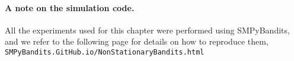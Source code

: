 


\paragraph{A note on the simulation code.}
%
All the experiments used for this chapter were performed using SMPyBandits,
and we refer to the following page for details on how to reproduce them,
\texttt{SMPyBandits.GitHub.io/NonStationaryBandits.html}
